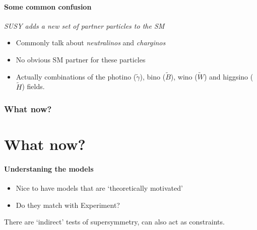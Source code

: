 \documentclass{beamer}
\begin{document}
\subsection{Some common confusion}
\begin{frame}{\insertsubsection}
\emph{SUSY adds a new set of partner particles to the SM}
\begin{itemize} 
    \item Commonly talk about \emph{neutralinos} and \emph{charginos}
    \item No obvious SM partner for these particles
    \item Actually combinations of the photino ($\tilde{\gamma}$),
    bino ($\tilde{B}$), wino ($\tilde{W}$) and higgsino ($\tilde{H}$) fields.
\end{itemize}
\end{frame}

\section{What now?}
\part{What now?}
\frame{\partpage}
\subsection{Understaning the models}
\begin{frame}{\insertsubsection}
\begin{itemize}
    \item Nice to have models that are `theoretically motivated'
    \item Do they match with Experiment?
\end{itemize}
There are `indirect' tests of supersymmetry, can also act as constraints.
\end{frame}
\end{document}
